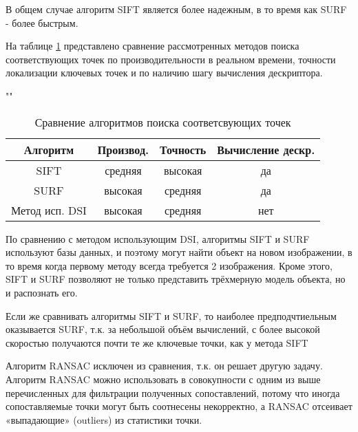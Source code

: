 В общем случае алгоритм SIFT является более надежным, в то время как SURF - более быстрым.

На таблице \ref{tab} представлено сравнение рассмотренных методов поиска соответствующих  точек по производительности в реальном времени, точности локализации ключевых точек и по наличию шагу вычисления дескриптора.

\begin{table}[H]
	\begin{center}
		\caption{Сравнение алгоритмов поиска соответсвующих точек}
		\label{tab}
		""\newline
		\begin{tabular}{ | c | c | c | c | }
			\hline
			Алгоритм & Производ.  & Точность & Вычисление дескр. \\ \hline
			SIFT & средняя & высокая & да \\ \hline
			SURF & высокая & средняя & да \\ \hline
			Метод исп. DSI & высокая & средняя & нет \\ \hline
		\end{tabular}
	\end{center}
\end{table}

По сравнению с методом использующим DSI, алгоритмы SIFT и SURF используют базы данных, и поэтому могут найти объект на новом изображении, в то время когда первому методу всегда требуется 2 изображения. Кроме этого, SIFT и SURF позволяют не только представить трёхмерную модель объекта, но и распознать его.

Если же сравнивать алгоритмы SIFT и SURF, то наиболее предподчтиельным оказывается SURF, т.к. за небольшой объём вычислений, с более высокой скоростью получаются почти те же ключевые точки, как у метода SIFT

Алгоритм RANSAC исключен из сравнения, т.к. он решает другую задачу. Алгоритм RANSAC можно использовать в совокупности с одним из выше перечисленных для фильтрации полученных сопоставлений, потому что иногда сопоставляемые точки могут быть соотнесены некорректно, а RANSAC отсеивает «выпадающие» (outliers) из статистики точки.

